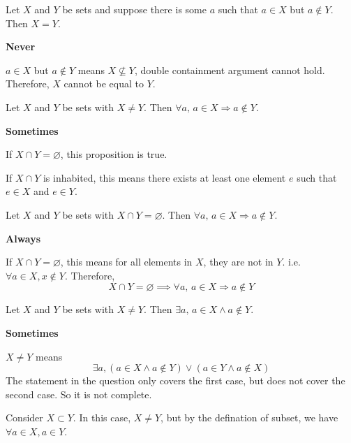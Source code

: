 \begin{chapex} %
Let $X$ and $Y$ be sets and suppose there is some $a$ such that $a \in X$ but $a \not\in Y$. Then $X = Y$.
\end{chapex}

\begin{mysolution}
    \textbf{Never}

    $a \in X$ but $a \not\in Y$ means $X \nsubseteq Y$, double containment argument cannot hold. Therefore, $X$ cannot be equal to $Y$.
\end{mysolution}

\begin{chapex} %
Let $X$ and $Y$ be sets with $X \ne Y$. Then $\forall a,\, a \in X \Rightarrow a \not\in Y$.
\end{chapex}

\begin{mysolution}
    \textbf{Sometimes}

    If $X \cap Y = \varnothing$, this proposition is true.

    If $X \cap Y$ is inhabited, this means there exists at least one element $e$ such that $e \in X$ and $e \in Y$.
\end{mysolution}

\begin{chapex} %
Let $X$ and $Y$ be sets with $X \cap Y = \varnothing$. Then $\forall a,\, a \in X \Rightarrow a \not\in Y$.
\end{chapex}

\begin{mysolution}
    \textbf{Always}

    If $X \cap Y = \varnothing$, this means for all elements in $X$, they are not in $Y$. i.e. $\forall a \in X, x \notin Y$. Therefore,
    \[X \cap Y = \varnothing \implies \forall a,\, a \in X \Rightarrow a \not\in Y\]
\end{mysolution}

\begin{chapex} %
Let $X$ and $Y$ be sets with $X \ne Y$. Then $\exists a,\, a \in X \wedge a \not\in Y$.
\end{chapex}

\begin{mysolution}
    \textbf{Sometimes}
    
    $X \ne Y$ means
    \[\exists a, (a \in X \land a \notin Y) \lor (a \in Y \land a \notin X) \]
    The statement in the question only covers the first case, but does not cover the second case. So it is not complete.

    Consider $X \subset Y$. In this case, $X \ne Y$, but by the defination of subset, we have $\forall a \in X, a \in Y$.
\end{mysolution}

